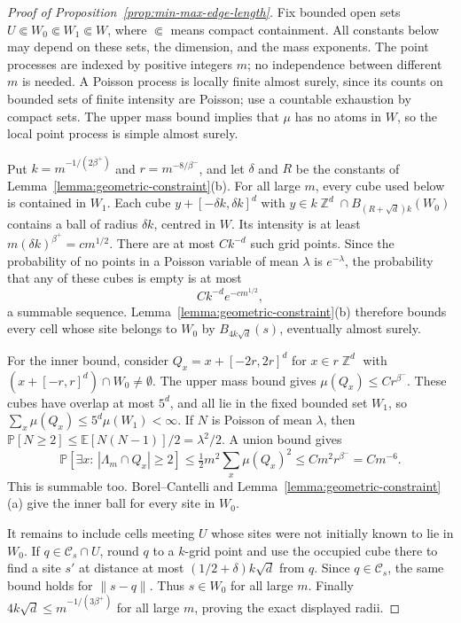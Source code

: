 \documentclass[12pt]{amsart}
\numberwithin{equation}{section}
\DeclareMathOperator{\Z}{\mathbb{Z}}
\renewcommand*{\P}{\mathbb P}
\begin{document}
\begin{proof}[Proof of Proposition~\ref{prop:min-max-edge-length}]
Fix bounded open sets $U\Subset W_0\Subset W_1\Subset W$, where $\Subset$ means compact containment. All constants below may depend on these sets, the dimension, and the mass exponents. The point processes are indexed by positive integers $m$; no independence between different $m$ is needed. A Poisson process is locally finite almost surely, since its counts on bounded sets of finite intensity are Poisson; use a countable exhaustion by compact sets. The upper mass bound implies that $\mu$ has no atoms in $W$, so the local point process is simple almost surely.

Put $k=m^{-1/(2\beta^+)}$ and $r=m^{-8/\beta^-}$, and let $\delta$ and $R$ be the constants of Lemma~\ref{lemma:geometric-constraint}(b). For all large $m$, every cube used below is contained in $W_1$. Each cube $y+[-\delta k,\delta k]^d$ with $y\in k\Z^d\cap B_{(R+\sqrt d)k}(W_0)$ contains a ball of radius $\delta k$, centred in $W$. Its intensity is at least $m(\delta k)^{\beta^+}=c m^{1/2}$. There are at most $Ck^{-d}$ such grid points. Since the probability of no points in a Poisson variable of mean $\lambda$ is $e^{-\lambda}$, the probability that any of these cubes is empty is at most
\[
 Ck^{-d}e^{-cm^{1/2}},
\]
a summable sequence. Lemma~\ref{lemma:geometric-constraint}(b) therefore bounds every cell whose site belongs to $W_0$ by $B_{4k\sqrt d}(s)$, eventually almost surely.

For the inner bound, consider $Q_x=x+[-2r,2r]^d$ for $x\in r\Z^d$ with $(x+[-r,r]^d)\cap W_0\neq\emptyset$. The upper mass bound gives $\mu(Q_x)\leq C r^{\beta^-}$. These cubes have overlap at most $5^d$, and all lie in the fixed bounded set $W_1$, so $\sum_x\mu(Q_x)\leq5^d\mu(W_1)<\infty$. If $N$ is Poisson of mean $\lambda$, then $\P[N\geq2]\leq\mathbb E[N(N-1)]/2=\lambda^2/2$. A union bound gives
\[
 \P[\exists x:\,|\Lambda_m\cap Q_x|\geq2]
 \leq\tfrac12 m^2\sum_x\mu(Q_x)^2
 \leq C m^2r^{\beta^-}=C m^{-6}.
\]
This is summable too. Borel--Cantelli and Lemma~\ref{lemma:geometric-constraint}(a) give the inner ball for every site in $W_0$.

It remains to include cells meeting $U$ whose sites were not initially known to lie in $W_0$. If $q\in\mathcal C_s\cap U$, round $q$ to a $k$-grid point and use the occupied cube there to find a site $s'$ at distance at most $(1/2+\delta)k\sqrt d$ from $q$. Since $q\in\mathcal C_s$, the same bound holds for $\|s-q\|$. Thus $s\in W_0$ for all large $m$. Finally $4k\sqrt d\leq m^{-1/(3\beta^+)}$ for all large $m$, proving the exact displayed radii.


\end{proof}
\end{document}
